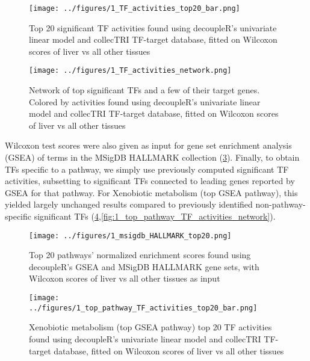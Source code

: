 \documentclass{article}
\begin{document}
\begin{figure}[htbp]
  \centering
  \texttt{[image: ../figures/1\_TF\_activities\_top20\_bar.png]}
  \caption{Top 20 significant TF activities found using decoupleR's univariate linear model and collecTRI TF-target database, fitted on Wilcoxon scores of liver vs all other tissues}
  \label{fig:1_TF_activities_top20_bar}
\end{figure}

\begin{figure}[htbp]
  \centering
  \texttt{[image: ../figures/1\_TF\_activities\_network.png]}
  \caption{Network of top significant TFs and a few of their target genes. Colored by activities found using decoupleR's univariate linear model and collecTRI TF-target database, fitted on Wilcoxon scores of liver vs all other tissues}
  \label{fig:1_TF_activities_top20_bar}
\end{figure}
\FloatBarrier

Wilcoxon test scores were also given as input for gene set enrichment analysis (GSEA) of terms in the MSigDB HALLMARK collection (\ref{fig:1_msigdb_HALLMARK_top20}). Finally, to obtain TFs specific to a pathway, we simply use previously computed significant TF activities, subsetting to significant TFs connected to leading genes reported by GSEA for that pathway. For Xenobiotic metabolism (top GSEA pathway), this yielded largely unchanged results compared to previously identified non-pathway-specific significant TFs (\ref{fig:1_top_pathway_TF_activities_top20_bar},\ref{fig:1_top_pathway_TF_activities_network}). 

\begin{figure}[htbp]
  \centering
  \texttt{[image: ../figures/1\_msigdb\_HALLMARK\_top20.png]}
  \caption{Top 20 pathways' normalized enrichment scores found using decoupleR's GSEA and MSigDB HALLMARK gene sets, with Wilcoxon scores of liver vs all other tissues as input}
  \label{fig:1_msigdb_HALLMARK_top20}
\end{figure}

\begin{figure}[htbp]
  \centering
  \texttt{[image: ../figures/1\_top\_pathway\_TF\_activities\_top20\_bar.png]}
  \caption{Xenobiotic metabolism (top GSEA pathway) top 20 TF activities found using decoupleR's univariate linear model and collecTRI TF-target database, fitted on Wilcoxon scores of liver vs all other tissues}
  \label{fig:1_top_pathway_TF_activities_top20_bar}
\end{figure}
\end{document}
